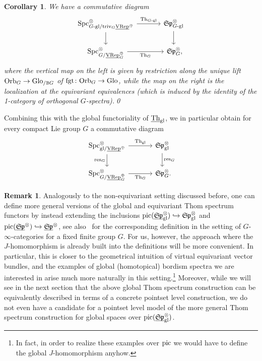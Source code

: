 \documentclass[reqno]{memo-l}
\theoremstyle{mythm}
\newtheorem{cor}[thm]{Corollary}
\theoremstyle{definition}
\newtheorem{rk}[thm]{Remark}
\numberwithin{equation}{section}
\newcommand{\gl}{\textup{gl}}
\DeclareMathOperator{\Spc}{Spc}
\newcommand{\triv}{{\textup{triv}}}
\newcommand{\fgt}{\textup{fgt}}
\newcommand{\Orb}{{\vphantom{\textup{t}}\smash{\textup{Orb}}}}
\newcommand{\Glo}{\textup{Glo}}
\newcommand{\res}{\textup{res}}
\newcommand{\BGcat}[1]{\mathbb B{#1}}
\newcommand{\ulhelper}[2]{\underline{\setbox0=\hbox{$#1#2$}\dp0=0.4pt \box0\relax}}
\newcommand{\ul}[1]{{\mathpalette\ulhelper{#1}}\hbox{\rule[-2pt]{0pt}{0pt}}}
\newcommand{\mySp}{{\mathfrak S\kern-.5pt\mathfrak p}}
\newcommand{\Th}{{\textup{Th}}}
\newcommand{\pic}{\textup{pic}}
\newcommand{\VRep}{\textup{VRep}}
\begin{document}
\begin{cor}
    We have a commutative diagram
    \[
        \begin{tikzcd}
            \Spc_{\textup{$G$-gl}/\triv_G\ul\VRep^{\oplus}}^\otimes\arrow[d]\arrow[r,"\Th_\textup{$G$-gl}"] &[1em] \mySp_\textup{$G$-gl}^\otimes\arrow[d]\\
            \Spc_{G/\ul\VRep^{\oplus}_G}^\otimes\arrow[r,"\Th_G"'] & \mySp_G^\otimes\rlap,
        \end{tikzcd}
    \]
    where the vertical map on the left is given by restriction along the unique lift $\Orb_G\to\Glo_{/\BGcat{G}}$ of $\fgt\colon\Orb_G\to\Glo$, while the map on the right is the localization at the equivariant equivalences (which is induced by the identity of the 1-category of orthogonal $G$-spectra).\qed
\end{cor}
Combining this with the global functoriality of $\ul\Th_{\gl}$, we in particular obtain for every compact Lie group $G$ a commutative diagram
    \[
        \begin{tikzcd}
            \Spc_{\textup{gl}/\ul\VRep^{\oplus}}^\otimes\arrow[d,"\res_G"']\arrow[r,"\Th_\textup{gl}"] &[1em] \mySp_\textup{gl}^\otimes\arrow[d,"\res_G"]\\
            \Spc_{G/\ul\VRep^{\oplus}_G}^\otimes\arrow[r,"\Th_G"'] & \mySp_G^\otimes\rlap.
        \end{tikzcd}
    \]
\begin{rk}\label{rk:Thom-pic}
    Analogously to the non-equivariant setting discussed before, one can define more general versions of the global and equivariant Thom spectrum functors by instead extending the inclusions $\pic(\ul\mySp_\gl^\otimes)\hookrightarrow\mySp_\gl^\otimes$ and $\pic(\ul\mySp^\otimes)\hookrightarrow\ul\mySp^\otimes$, see also~\cite{horev-klang-zou} for the corresponding definition in the setting of $G$-$\infty$-categories for a fixed finite group $G$. For us, however, the approach where the $J$-homomorphism is already built into the definitions will be more convenient. In particular, this is closer to the geometrical intuition of virtual equivariant vector bundles, and the examples of global (homotopical) bordism spectra we are interested in arise much more naturally in this setting.\footnote{In fact, in order to realize these examples over $\pic$ we would have to define the global $J$-homomorphism anyhow.} Moreover, while we will see in the next section that the above global Thom spectrum construction can be equivalently described in terms of a concrete pointset level construction, we do not even have a candidate for a pointset level model of the more general Thom spectrum construction for global spaces over $\pic(\ul\mySp_\gl^\otimes)$.
\end{rk}
\end{document}
